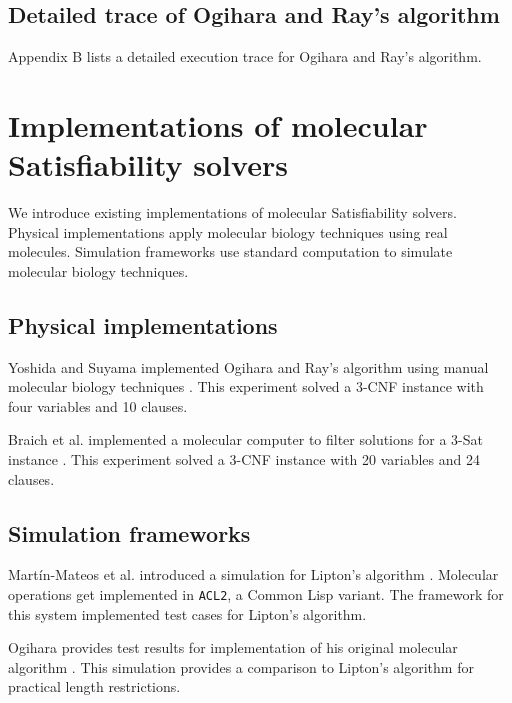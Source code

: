 	\subsection{Detailed trace of Ogihara and Ray's algorithm}
	
Appendix B lists a detailed execution trace for Ogihara and Ray's algorithm.

\section{Implementations of molecular {\sc Satisfiability} solvers}

We introduce existing implementations of molecular {\sc Satisfiability} solvers.  Physical implementations apply molecular biology techniques using real molecules.  Simulation frameworks use standard computation to simulate molecular biology techniques.

	\subsection{Physical implementations}
	

Yoshida and Suyama implemented Ogihara and Ray's algorithm using manual molecular biology techniques \cite{dnaBasedImplemetation_Yoshida2000}.  This experiment solved a 3-CNF instance with four variables and 10 clauses.

Braich et al. implemented a molecular computer to filter solutions for a 3-{\sc Sat} instance \cite{Braich02solutionof}.  This experiment solved a 3-CNF instance with 20 variables and 24 clauses.
	
	\subsection{Simulation frameworks}

Martín-Mateos et al. introduced a simulation for Lipton's algorithm \cite{MartinMateos02molecularcomputation}.   Molecular operations get implemented in \texttt{ACL2}, a Common Lisp variant.  The framework for this system implemented test cases for Lipton's algorithm.

Ogihara provides test results for implementation of his original molecular algorithm \cite{Ogihara:1996:BFS:898228}.  This simulation provides a comparison to Lipton's algorithm for practical length restrictions.
